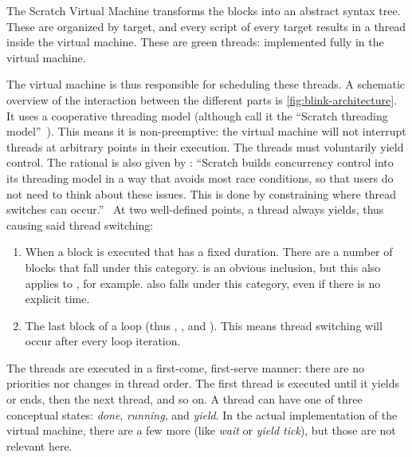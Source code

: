\documentclass[../main]{subfiles}
\begin{document}
The Scratch Virtual Machine transforms the blocks into an abstract syntax tree.
These are organized by target, and every script of every target results in a thread inside the virtual machine.
These are green threads: implemented fully in the virtual machine.

The virtual machine is thus responsible for scheduling these threads.
A schematic overview of the interaction between the different parts is \cref{fig:blink-architecture}.
It uses a cooperative threading model (although \citeauthor{maloneyScratchProgrammingLanguage2010a} call it the ``Scratch threading model''~\autocite{maloneyScratchProgrammingLanguage2010a}).
This means it is non-preemptive: the virtual machine will not interrupt threads at arbitrary points in their execution.
The threads must voluntarily yield control.
The rational is also given by \citeauthor{maloneyScratchProgrammingLanguage2010a}: ``Scratch builds concurrency control into its threading model in a way that avoids most race conditions, so that users do not need to think about these issues.
This is done by constraining where thread switches can occur.''~\autocite{maloneyScratchProgrammingLanguage2010a}
At two well-defined points, a thread always yields, thus causing said thread switching:

\begin{enumerate}
    \item When a block is executed that has a fixed duration.
        There are a number of blocks that fall under this category.
         is an obvious inclusion, but this also applies to , for example.
         also falls under this category, even if there is no explicit time.
    \item The last block of a loop (thus , , and ).
        This means thread switching will occur after every loop iteration.
\end{enumerate}

The threads are executed in a first-come, first-serve manner: there are no priorities nor changes in thread order.
The first thread is executed until it yields or ends, then the next thread, and so on.
A thread can have one of three conceptual states: \emph{done}, \emph{running}, and \emph{yield}.
In the actual implementation of the virtual machine, there are a few more (like \emph{wait} or \emph{yield tick}), but those are not relevant here.
\end{document}

